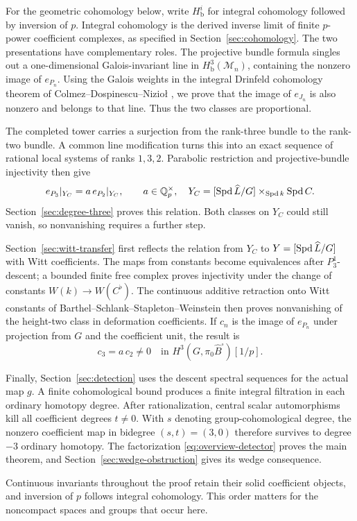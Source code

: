 For the geometric cohomology below, write \(H^i_{\mathrm b}\) for
integral cohomology followed by inversion of \(p\). Integral cohomology
is the derived inverse limit of finite \(p\)-power coefficient complexes,
as specified in Section~\ref{sec:cohomology}.
The two presentations have complementary roles. The projective bundle
formula singles out a one-dimensional Galois-invariant line in
\(H^3_{\mathrm b}(\mathcal M_n)\), containing the nonzero image of \(e_{P_n}\).
Using the Galois weights in the integral Drinfeld cohomology theorem
of Colmez--Dospinescu--Nizioł \cite[Theorems~1.1 and~5.1]{CDN2021},
we prove that the image of \(e_{J_n}\) is also nonzero and belongs
to that line. Thus the two
classes are proportional.

The completed tower carries a surjection from the rank-three bundle
to the rank-two bundle. A common line modification turns this into
an exact sequence of rational local systems of ranks \(1,3,2\).
Parabolic restriction and projective-bundle injectivity then give
\[
 e_{P_3}|_{Y_C}=a\,e_{P_2}|_{Y_C},\qquad a\in\mathbb Q_p^\times,
 \quad
 Y_C=[\operatorname{Spd}\widehat L/G]\times_{\operatorname{Spd} k}\operatorname{Spd} C.
\]
Section~\ref{sec:degree-three} proves this relation. Both classes on
\(Y_C\) could still vanish, so nonvanishing requires a further step.

Section~\ref{sec:witt-transfer} first reflects the relation from
\(Y_C\) to \(Y=[\operatorname{Spd}\widehat L/G]\) with Witt coefficients. The
maps from constants become equivalences after \(P_3^1\)-descent;
a bounded finite free complex proves injectivity under the change
of constants \(W(k)\to W(C^\flat)\). The continuous additive
retraction onto Witt constants of Barthel--Schlank--Stapleton--Weinstein
\cite[Proposition~2.5.1 and Corollary~2.5.9]{BSSW2025} then proves
nonvanishing of the height-two class in deformation coefficients.
If \(c_n\) is the image of \(e_{P_n}\) under projection from \(G\)
and the coefficient unit, the result is
\[
 c_3=a\,c_2\ne0
 \quad\text{in }H^3(G,\pi_0\widehat B^\square)[1/p].
\]

Finally, Section~\ref{sec:detection} uses the descent spectral
sequences for the actual map \(g\). A finite cohomological bound
produces a finite integral filtration in each ordinary homotopy
degree. After rationalization, central scalar automorphisms kill
all coefficient degrees \(t\ne0\). With \(s\) denoting group-cohomological
degree, the nonzero coefficient map in bidegree \((s,t)=(3,0)\) therefore survives to degree \(-3\) ordinary
homotopy. The factorization \eqref{eq:overview-detector} proves the
main theorem, and Section~\ref{sec:wedge-obstruction} gives its
wedge consequence.

Continuous invariants throughout the proof retain their solid
coefficient objects, and inversion of \(p\) follows integral cohomology.
This order matters for the noncompact spaces and groups that occur here.
